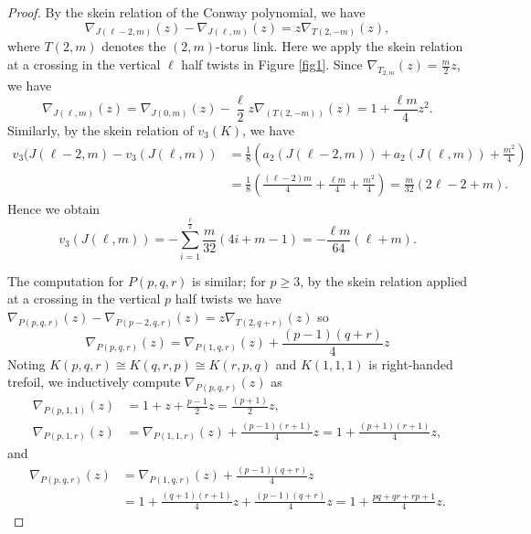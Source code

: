 \documentclass{amsart}
\theoremstyle{remark}
\theoremstyle{definition}
\begin{document}
\begin{proof}
By the skein relation of the Conway polynomial, we have
\[
 \nabla_{J(\ell-2, m)}(z) -\nabla_{J(\ell,m)}(z) = z \nabla_{T(2, - m)}(z), 
\]
where $T(2,m)$ denotes the $(2,m)$-torus link. 
Here we apply the skein relation at a crossing in the vertical $\ell$ half twists in Figure \ref{fig1}.
Since $\nabla_{T_{2,m}}(z)=\frac{m}{2}z$, we have  
\[
\nabla_{J(\ell, m)}(z) = \nabla_{J(0, m)} (z) - \frac{\ell}{2} z \nabla_{(T(2,-m))}(z) = 1+\frac{\ell m}{4}z^{2}.
\]
Similarly, by the skein relation of $v_{3}(K)$, we have 
\begin{align*}
v_{3}(J(\ell-2,m) - v_{3}(J(\ell,m)) &= \frac{1}{8} \left(a_{2}(J(\ell-2,m)) +a_{2}(J(\ell,m))+\frac{m^{2}}{4} \right) \\
&= \frac{1}{8}\left( \frac{(\ell-2)m}{4} + \frac{\ell m}{4}+\frac{m^{2}}{4} \right)= \frac{m}{32}(2\ell-2+m) . 
\end{align*}
Hence we obtain 
\[  v_{3}(J(\ell,m))=-\sum_{i=1}^{\frac{\ell}{2}} \frac{m}{32}(4i+m-1) =-\frac{\ell m}{64}(\ell + m). 
\] 

The computation for $P(p,q,r)$ is similar; for $p \geq 3$, by the skein relation applied at a crossing in the vertical $p$ half twists we have $\nabla_{P(p,q,r)}(z) - \nabla_{P(p-2,q,r)}(z)= z\nabla_{T(2,q+r)}(z)$
so
\[ \nabla_{P(p,q,r)}(z) = \nabla_{P(1,q,r)}(z)+\frac{(p-1)(q+r)}{4}z\]
Noting $K(p,q,r)\cong K(q,r,p) \cong K(r,p,q)$ and $K(1,1,1)$ is right-handed trefoil, we inductively compute $\nabla_{P(p,q,r)}(z)$ as
\begin{align*}
\nabla_{P(p,1,1)}(z) &= 1+z + \frac{p-1}{2}z = \frac{(p+1)}{2}z,\\
\nabla_{P(p,1,r)}(z) &= \nabla_{P(1,1,r)}(z) + \frac{(p-1)(r+1)}{4}z = 1+ \frac{(p+1)(r+1)}{4}z, 
\end{align*}
and
\begin{align*}
\nabla_{P(p,q,r)}(z) &=\nabla_{P(1,q,r)}(z)+\frac{(p-1)(q+r)}{4}z \\
&= 1+ \frac{(q+1)(r+1)}{4}z + \frac{(p-1)(q+r)}{4}z =1+\frac{pq+qr+rp+1}{4}z.
\end{align*}


\end{proof}
\end{document}
